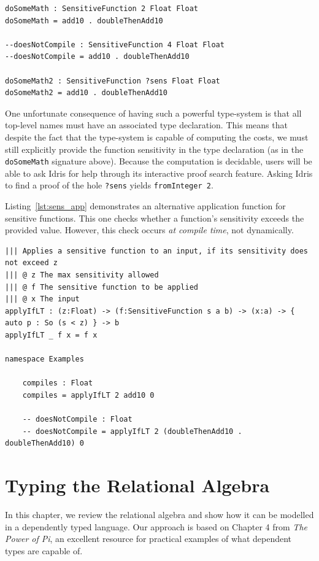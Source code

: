 \documentclass[12pt]{report}
\begin{document}
\begin{lstlisting}[caption={Examples of Sensitive Function Composition},label={lst:composition_examples}]
doSomeMath : SensitiveFunction 2 Float Float
doSomeMath = add10 . doubleThenAdd10

--doesNotCompile : SensitiveFunction 4 Float Float
--doesNotCompile = add10 . doubleThenAdd10

doSomeMath2 : SensitiveFunction ?sens Float Float
doSomeMath2 = add10 . doubleThenAdd10
\end{lstlisting}

One unfortunate consequence of having such a powerful type-system is that all top-level names must have an associated type declaration.
This means that despite the fact that the type-system is capable of computing the costs, we must still explicitly provide the function sensitivity in the type declaration (as in the \texttt{doSomeMath} signature above).
Because the computation is decidable, users will be able to ask Idris for help through its interactive proof search feature.
Asking Idris to find a proof of the hole \texttt{?sens} yields \texttt{fromInteger 2}.

Listing~\ref{lst:sens_app} demonstrates an alternative application function for sensitive functions.
This one checks whether a function's sensitivity exceeds the provided value.
However, this check occurs \textit{at compile time}, not dynamically.

\begin{lstlisting}[caption={Sensitivity-aware function application},label={lst:sens_app}]
||| Applies a sensitive function to an input, if its sensitivity does not exceed z
||| @ z The max sensitivity allowed
||| @ f The sensitive function to be applied
||| @ x The input
applyIfLT : (z:Float) -> (f:SensitiveFunction s a b) -> (x:a) -> { auto p : So (s < z) } -> b
applyIfLT _ f x = f x

namespace Examples

    compiles : Float
    compiles = applyIfLT 2 add10 0

    -- doesNotCompile : Float
    -- doesNotCompile = applyIfLT 2 (doubleThenAdd10 . doubleThenAdd10) 0
\end{lstlisting}

\chapter{Typing the Relational Algebra}\label{sec:typing_the_relational_algebra}

In this chapter, we review the relational algebra and show how it can be modelled in a dependently typed language.
Our approach is based on Chapter 4 from \textit{The Power of Pi}\cite{OurySwierstra08PowerOfPi}, an excellent resource for practical examples of what dependent types are capable of.
\end{document}
